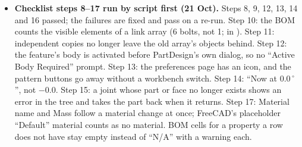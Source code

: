 \begin{itemize}[nosep]
        watchers as content, and closing a dialog sent no update. All three fixed (\code{[BW]} in
        , , ); the card now shows only while
        a command is open.
  \item \textbf{Checklist steps 8--17 run by script first (21 Oct).} Steps 8, 9, 12, 13, 14 and 16 passed; the
        failures are fixed and pass on a re-run. Step 10: the BOM counts the visible elements of a link array
        (6 bolts, not 1; \code{[BW]} in ). Step 11: independent copies no longer leave the
        old array's  objects behind. Step 12: the feature's body is activated before
        PartDesign's own dialog, so no ``Active Body Required'' prompt. Step 13: the preferences page has an
        icon, and the pattern buttons go away without a workbench switch. Step 14: ``Now at 0.0\,$^\circ$'', not
        $-0.0$. Step 15: a joint whose part or face no longer exists shows an error in the tree and takes the
        part back when it returns. Step 17: Material name and Mass follow a material change at once; FreeCAD's
        placeholder ``Default'' material counts as no material. BOM cells for a property a row does not have
        stay empty instead of ``N/A'' with a warning each.
\end{itemize}
